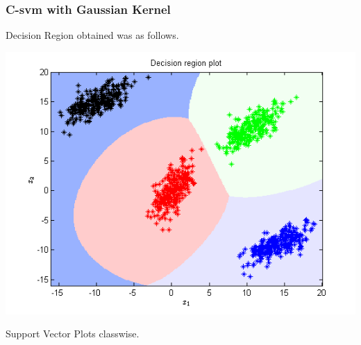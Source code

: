 \documentclass{article}
\begin{document}
\subsubsection{C-svm with Gaussian Kernel}
Decision Region obtained was as follows.
\begin{center}
\includegraphics[scale=0.8]{Classification/1a/c_g/dec}
\end{center}
\newpage
Support Vector Plots classwise.
\end{document}
